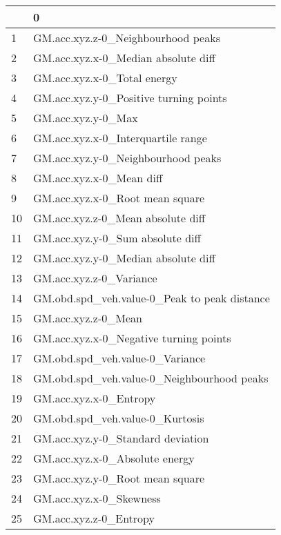 \begin{tabular}{ll}
\toprule
{} &                                                 0 \\
\midrule
1   &                GM.acc.xyz.z-0\_Neighbourhood peaks \\
2   &               GM.acc.xyz.x-0\_Median absolute diff \\
3   &                       GM.acc.xyz.x-0\_Total energy \\
4   &            GM.acc.xyz.y-0\_Positive turning points \\
5   &                                GM.acc.xyz.y-0\_Max \\
6   &                GM.acc.xyz.x-0\_Interquartile range \\
7   &                GM.acc.xyz.y-0\_Neighbourhood peaks \\
8   &                          GM.acc.xyz.x-0\_Mean diff \\
9   &                   GM.acc.xyz.x-0\_Root mean square \\
10  &                 GM.acc.xyz.z-0\_Mean absolute diff \\
11  &                  GM.acc.xyz.y-0\_Sum absolute diff \\
12  &               GM.acc.xyz.y-0\_Median absolute diff \\
13  &                           GM.acc.xyz.z-0\_Variance \\
14  &      GM.obd.spd\_veh.value-0\_Peak to peak distance \\
15  &                               GM.acc.xyz.z-0\_Mean \\
16  &            GM.acc.xyz.x-0\_Negative turning points \\
17  &                   GM.obd.spd\_veh.value-0\_Variance \\
18  &        GM.obd.spd\_veh.value-0\_Neighbourhood peaks \\
19  &                            GM.acc.xyz.x-0\_Entropy \\
20  &                   GM.obd.spd\_veh.value-0\_Kurtosis \\
21  &                 GM.acc.xyz.y-0\_Standard deviation \\
22  &                    GM.acc.xyz.x-0\_Absolute energy \\
23  &                   GM.acc.xyz.y-0\_Root mean square \\
24  &                           GM.acc.xyz.x-0\_Skewness \\
25  &                            GM.acc.xyz.z-0\_Entropy \\

\end{tabular}
